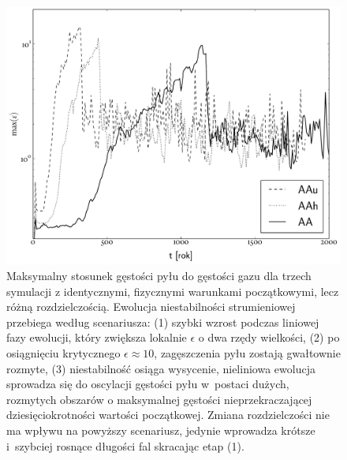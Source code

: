 \begin{figure}
   \includegraphics[width=0.98\linewidth]{figures/fig4}
   \caption[Test zbieżności symulacji AA, AAh, AAu.]
     {Maksymalny stosunek gęstości pyłu do gęstości gazu dla trzech symulacji z
      identycznymi, fizycznymi warunkami początkowymi, lecz różną
      rozdzielczością. Ewolucja niestabilności strumieniowej przebiega według
      scenariusza: (1) szybki wzrost podczas liniowej fazy ewolucji, który
      zwiększa lokalnie $\epsilon$ o dwa rzędy wielkości, (2) po
      osiągnięciu krytycznego $\epsilon\approx 10$, zagęszczenia pyłu zostają
      gwałtownie rozmyte, (3) niestabilność osiąga wysycenie, nieliniowa
      ewolucja sprowadza się do oscylacji gęstości pyłu w~postaci dużych,
      rozmytych obszarów o maksymalnej gęstości nieprzekraczającej
      dziesięciokrotności wartości początkowej. Zmiana rozdzielczości nie ma
      wpływu na powyższy scenariusz, jedynie wprowadza krótsze i~szybciej
   rosnące długości fal skracając etap (1).}

   \label{fig4}
\end{figure}
%

